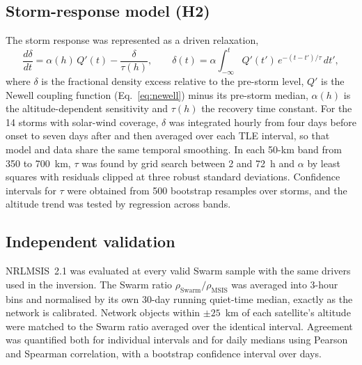 \documentclass[11pt]{article}
\newcommand{\rhomsis}{\rho_{\mathrm{MSIS}}}
\begin{document}
\subsection{Storm-response model (H2)}
The storm response was represented as a driven relaxation,
\begin{equation}
\frac{d\delta}{dt} = \alpha(h)\, Q'(t) - \frac{\delta}{\tau(h)},
\qquad
\delta(t) = \alpha \int_{-\infty}^{t} Q'(t')\, e^{-(t-t')/\tau}\, dt',
\label{eq:relax}
\end{equation}
where $\delta$ is the fractional density excess relative to the pre-storm level, $Q'$ is the Newell coupling function (Eq.~\ref{eq:newell}) minus its pre-storm median, $\alpha(h)$ is the altitude-dependent sensitivity and $\tau(h)$ the recovery time constant. For the 14 storms with solar-wind coverage, $\delta$ was integrated hourly from four days before onset to seven days after and then averaged over each TLE interval, so that model and data share the same temporal smoothing. In each 50-km band from 350 to 700~km, $\tau$ was found by grid search between 2 and 72~h and $\alpha$ by least squares with residuals clipped at three robust standard deviations. Confidence intervals for $\tau$ were obtained from 500 bootstrap resamples over storms, and the altitude trend was tested by regression across bands.

\subsection{Independent validation}
NRLMSIS~2.1 was evaluated at every valid Swarm sample with the same drivers used in the inversion. The Swarm ratio $\rho_{\mathrm{Swarm}}/\rhomsis$ was averaged into 3-hour bins and normalised by its own 30-day running quiet-time median, exactly as the network is calibrated. Network objects within $\pm 25$~km of each satellite's altitude were matched to the Swarm ratio averaged over the identical interval. Agreement was quantified both for individual intervals and for daily medians using Pearson and Spearman correlation, with a bootstrap confidence interval over days.
\end{document}
